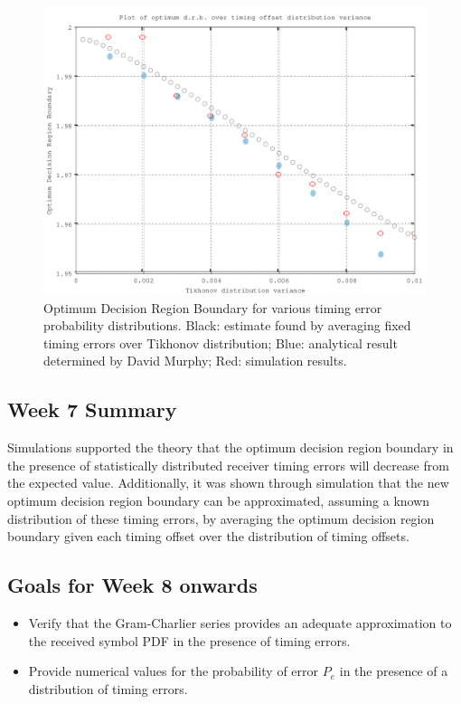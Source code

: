 \begin{figure}[htbp]
\centering
\includegraphics[width=\linewidth]{../../../plots/opt_dec_reg.png}
\caption[Optimum Decision Region Boundary for various timing error
probability distributions]{Optimum Decision Region Boundary for various timing error
probability distributions. Black: estimate found by averaging fixed timing errors over Tikhonov distribution; Blue: analytical result determined by David Murphy; Red: simulation results.}
\end{figure}

\subsection{Week 7 Summary}

Simulations supported the theory that the optimum decision region
boundary in the presence of statistically distributed receiver timing
errors will decrease from the expected value. Additionally, it was shown
through simulation that the new optimum decision region boundary can be
approximated, assuming a known distribution of these timing errors, by
averaging the optimum decision region boundary given each timing offset
over the distribution of timing offsets.

\subsection{Goals for Week 8 onwards}

\begin{itemize}
\itemsep1pt\parskip0pt
\item
  Verify that the Gram-Charlier series provides an adequate
  approximation to the received symbol PDF in the presence of timing
  errors.
\item
  Provide numerical values for the probability of error $P_e$ in the
  presence of a distribution of timing errors.
\end{itemize}

